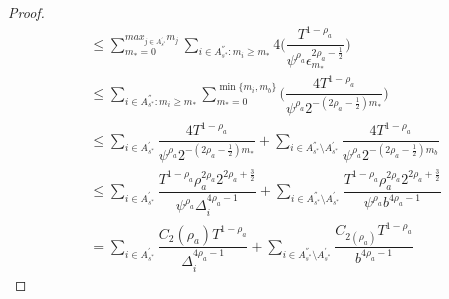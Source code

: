 \begin{proof}
\begin{align*}
&\leq\sum_{m_{*}=0}^{max_{j\in A^{'}_{s^{*}}}m_{j}}\sum_{i\in A^{''}_{s^{*}}:m_{i} \geq m_{*}}4\bigg(\dfrac{T^{1-\rho_{a}}}{\psi^{\rho_{a}}\epsilon_{m_{*}}^{2\rho_{a}-\frac{1}{2}}} \bigg)\\
&\leq\sum_{i\in A^{''}_{s^{*}}:m_{i} \geq m_{*}}\sum_{m_{*}=0}^{\min{\lbrace m_{i},m_{b}\rbrace}}\bigg(\dfrac{4T^{1-\rho_{a}}}{\psi^{\rho_{a}}2^{-(2\rho_{a}-\frac{1}{2})m_{*}}} \bigg)\\
&\leq\sum_{i\in A^{'}_{s^{*}}}\dfrac{4T^{1-\rho_{a}}}{\psi^{\rho_{a}}2^{-(2\rho_{a}-\frac{1}{2})m_{*}}} +\sum_{i\in A^{''}_{s^{*}}\setminus A^{'}_{s^{*}}}\dfrac{4T^{1-\rho_{a}}}{\psi^{\rho_{a}}2^{-(2\rho_{a}-\frac{1}{2})m_{b}}} \\
&\leq\sum_{i\in A^{'}_{s^{*}}}\dfrac{T^{1-\rho_{a}}\rho_{a}^{2\rho_{a}}2^{2\rho_{a}+\frac{3}{2}}}{\psi^{\rho_{a}}\Delta_{i}^{4\rho_{a}-1}} +\sum_{i\in A^{''}_{s^{*}}\setminus A^{'}_{s^{*}}}\dfrac{T^{1-\rho_{a}}\rho_{a}^{2\rho_{a}}2^{2\rho_{a}+\frac{3}{2}}}{\psi^{\rho_{a}}b^{4\rho_{a}-1}} \\
& = \sum_{i\in A^{'}_{s^{*}}}\dfrac{ C_{2}(\rho_{a}) T^{1-\rho_{a}}}{\Delta_{i}^{4\rho_{a}-1}} +\sum_{i\in A^{''}_{s^{*}}\setminus A^{'}_{s^{*}}}\dfrac{C_{2(\rho_{a})}T^{1-\rho_{a}}}{b^{4\rho_{a}-1}}
\end{align*}





\end{proof}
